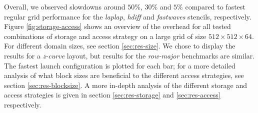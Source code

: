 Overall, we observed slowdowns around $50\%$, $30\%$ and $5\%$ compared to fastest regular grid performance for the \emph{laplap}, \emph{hdiff} and \emph{fastwaves} stencils, respectively. Figure \ref{fig:storage-access} shows an overview of the overhead for all tested combinations of storage and access strategy on a large grid of size $512\times 512\times 64$. For different domain sizes, see section \ref{sec:res-size}. We chose to display the results for a \emph{z-curve} layout, but results for the \emph{row-major} benchmarks are similar. The fastest launch configuration is plotted for each bar; for a more detailed analysis of what block sizes are beneficial to the different access strategies, see section \ref{sec:res-blocksize}. A more in-depth analysis of the different storage and access strategies is given in section \ref{sec:res-storage} and \ref{sec:res-access} respectively.